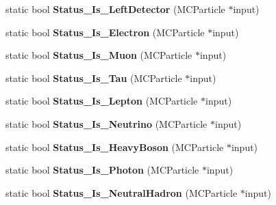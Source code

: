 \begin{DoxyCompactItemize}
\item 
\hypertarget{classToolSet_1_1CMC_ac893a50b848486f2ebfcdc877c148491}{
static bool {\bfseries Status\_\-Is\_\-LeftDetector} (MCParticle $\ast$input)}
\label{classToolSet_1_1CMC_ac893a50b848486f2ebfcdc877c148491}

\item 
\hypertarget{classToolSet_1_1CMC_a3d78b61ff25d63169a4bb76f2b3b1268}{
static bool {\bfseries Status\_\-Is\_\-Electron} (MCParticle $\ast$input)}
\label{classToolSet_1_1CMC_a3d78b61ff25d63169a4bb76f2b3b1268}

\item 
\hypertarget{classToolSet_1_1CMC_aa3543a71f0c9b7822dc45df8d7820e1b}{
static bool {\bfseries Status\_\-Is\_\-Muon} (MCParticle $\ast$input)}
\label{classToolSet_1_1CMC_aa3543a71f0c9b7822dc45df8d7820e1b}

\item 
\hypertarget{classToolSet_1_1CMC_afa2d4c47b2fe8348eb11fdd5956cdaa0}{
static bool {\bfseries Status\_\-Is\_\-Tau} (MCParticle $\ast$input)}
\label{classToolSet_1_1CMC_afa2d4c47b2fe8348eb11fdd5956cdaa0}

\item 
\hypertarget{classToolSet_1_1CMC_a23d5636609d812ec8ca6b0d10e69a885}{
static bool {\bfseries Status\_\-Is\_\-Lepton} (MCParticle $\ast$input)}
\label{classToolSet_1_1CMC_a23d5636609d812ec8ca6b0d10e69a885}

\item 
\hypertarget{classToolSet_1_1CMC_ae11398c05dd404fae775c49b0b2a5339}{
static bool {\bfseries Status\_\-Is\_\-Neutrino} (MCParticle $\ast$input)}
\label{classToolSet_1_1CMC_ae11398c05dd404fae775c49b0b2a5339}

\item 
\hypertarget{classToolSet_1_1CMC_aed24e1c551c05989497eca209494b4b7}{
static bool {\bfseries Status\_\-Is\_\-HeavyBoson} (MCParticle $\ast$input)}
\label{classToolSet_1_1CMC_aed24e1c551c05989497eca209494b4b7}

\item 
\hypertarget{classToolSet_1_1CMC_a6d949652a7db0e7e21d88a30174321ba}{
static bool {\bfseries Status\_\-Is\_\-Photon} (MCParticle $\ast$input)}
\label{classToolSet_1_1CMC_a6d949652a7db0e7e21d88a30174321ba}

\item 
\hypertarget{classToolSet_1_1CMC_ac8c420d5b46995cd4c11d10cb70be958}{
static bool {\bfseries Status\_\-Is\_\-NeutralHadron} (MCParticle $\ast$input)}
\label{classToolSet_1_1CMC_ac8c420d5b46995cd4c11d10cb70be958}


\end{DoxyCompactItemize}
